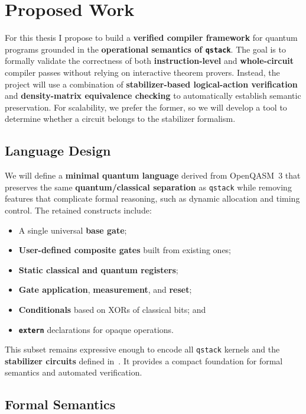 \section{Proposed Work}

For this thesis I propose to build a \textbf{verified compiler framework} for quantum programs grounded in the \textbf{operational semantics of \texttt{qstack}}.  
The goal is to formally validate the correctness of both \textbf{instruction-level} and \textbf{whole-circuit} compiler passes without relying on interactive theorem provers.  
Instead, the project will use a combination of \textbf{stabilizer-based logical-action verification} and \textbf{density-matrix equivalence checking} to automatically establish semantic preservation.  
For scalability, we prefer the former, so we will develop a tool to determine whether a circuit belongs to the stabilizer formalism.

\subsection{Language Design}

We will define a \textbf{minimal quantum language} derived from OpenQASM~3 that preserves the same \textbf{quantum/classical separation} as \texttt{qstack} while removing features that complicate formal reasoning, such as dynamic allocation and timing control.  
The retained constructs include:
\begin{itemize}
    \item A single universal \textbf{base gate};
    \item \textbf{User-defined composite gates} built from existing ones;
    \item \textbf{Static classical and quantum registers};
    \item \textbf{Gate application}, \textbf{measurement}, and \textbf{reset};
    \item \textbf{Conditionals} based on XORs of classical bits; and
    \item \textbf{\texttt{extern}} declarations for opaque operations.
\end{itemize}

This subset remains expressive enough to encode all \texttt{qstack} kernels and the \textbf{stabilizer circuits} defined in~\cite{kliuchnikov2023stabilizer}.  
It provides a compact foundation for formal semantics and automated verification.

\subsection{Formal Semantics}

